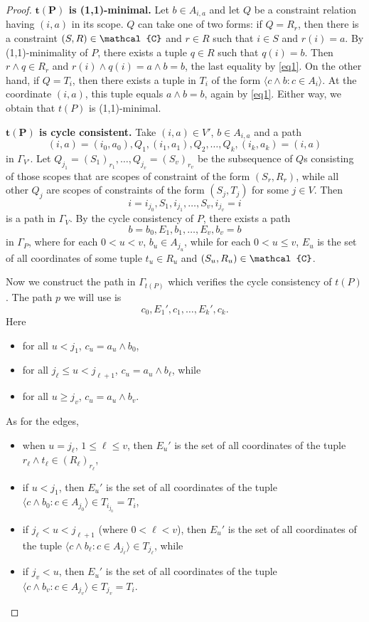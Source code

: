 \documentclass[11pt]{amsart}
\newcommand{\vr}[1]{{\uppercase {\mathcal{#1}}}}
\newcommand{\lb}{\langle}
\newcommand{\rb}{\rangle}
\newcommand{\mt}{\wedge}
\theoremstyle{definition}
\begin{document}
\begin{proof}
{\bf $\mathbf{t(P)}$ is (1,1)-minimal.} Let $b\in A_{i,a}$ and let $Q$ be a constraint relation having $(i,a)$ in its scope. $Q$ can take one of two forms: if $Q=R_r$, then there is a constraint $(S,R)\in\vr c$ and $r\in R$ such that $i\in S$ and $r(i)=a$. By (1,1)-minimality of $P$, there exists a tuple $q\in R$ such that $q(i)=b$. Then $r\mt q\in R_r$ and $r(i)\mt q(i)=a\mt b=b$, the last equality by \eqref{eq1}. On the other hand, if $Q=T_i$, then there exists a tuple in $T_i$ of the form $\lb c\mt b:c\in A_i\rb$. At the coordinate $(i,a)$, this tuple equals $a\mt b=b$, again by \eqref{eq1}. Either way, we obtain that $t(P)$ is (1,1)-minimal.

{\bf $\mathbf{t(P)}$ is cycle consistent.} Take $(i,a)\in V'$, $b\in A_{i,a}$ and a path 
\[(i,a)=(i_0,a_0),Q_1,(i_1,a_1),Q_2,\dots,Q_k,(i_k,a_k) = (i,a)\]
in $\Gamma_{V'}$. Let $Q_{j_1}=(S_1)_{r_1},\dots,Q_{j_v}=(S_v)_{r_v}$ be the subsequence of $Q$s consisting of those scopes that are scopes of constraint of the form $(S_r,R_r)$, while all other $Q_j$ are scopes of constraints of the form $(S_j,T_j)$ for some $j\in V$. Then 
\[i=i_{j_0},S_1,i_{j_1},\dots,S_v,i_{j_v}=i\]
is a path in $\Gamma_V$. By the cycle consistency of $P$, there exists a path
\[
b=b_0,E_1,b_1,\dots,E_v,b_v=b
\]
in $\Gamma_P$, where for each $0<u<v$, $b_u\in A_{j_u}$, while for each $0<u\leq v$, $E_u$ is the set of all coordinates of some tuple $t_u\in R_u$ and $(S_u,R_u)\in \vr c$.

Now we construct the path in $\Gamma_{t(P)}$ which verifies the cycle consistency of $t(P)$. The path $p$ we will use is
\[c_0,E_1',c_1,\dots,E_k',c_k.\]
Here 
\begin{itemize}
\item for all $u<j_1$, $c_u=a_u\mt b_0$,
\item for all $j_\ell\leq u<j_{\ell+1}$, $c_u=a_u\mt b_\ell$, while
\item for all $u\geq j_v$, $c_u=a_u\mt b_v$.
\end{itemize}
As for the edges,
\begin{itemize}
\item when $u=j_\ell$, $1\leq \ell\leq v$, then $E_u'$ is the set of all coordinates of the tuple $r_\ell\mt t_\ell\in (R_\ell)_{r_\ell}$,
\item if $u<j_1$, then $E_u'$ is the set of all coordinates of the tuple $\lb c\mt b_0:c\in A_{j_0}\rb\in T_{i_{j_0}}=T_i$, 
\item if $j_{\ell}<u<j_{\ell+1}$ (where $0<\ell< v$), then $E_u'$ is the set of all coordinates of the tuple $\lb c\mt b_\ell:c\in A_{j_\ell}\rb\in T_{j_\ell}$, while
\item if $j_v<u$, then $E_u'$ is the set of all coordinates of the tuple $\lb c\mt b_v:c\in A_{j_v}\rb\in T_{j_v}=T_i$.
\end{itemize}


\end{proof}
\end{document}
